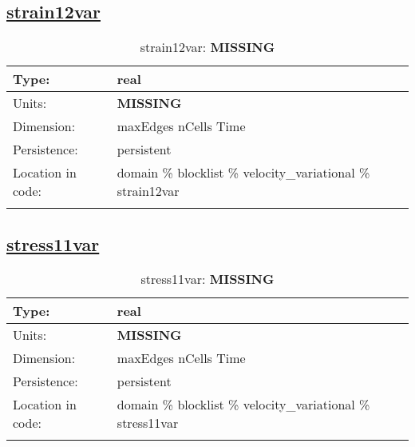 \subsection[strain12var]{\hyperref[sec:var_tab_velocity_variational]{strain12var}}
\label{subsec:var_sec_velocity_variational_strain12var}
\begin{center}
\begin{longtable}{| p{2.0in} | p{4.0in} |}
        \hline 
        Type: & real \\
        \hline 
        Units: & {\bf \color{red} MISSING} \\
        \hline 
        Dimension: & maxEdges nCells Time \\
        \hline 
        Persistence: & persistent \\
        \hline 
         Location in code: & domain \% blocklist \% velocity\_variational \% strain12var \\
         \hline 
    \caption{strain12var: {\bf \color{red} MISSING}}
\end{longtable}
\end{center}
\subsection[stress11var]{\hyperref[sec:var_tab_velocity_variational]{stress11var}}
\label{subsec:var_sec_velocity_variational_stress11var}
\begin{center}
\begin{longtable}{| p{2.0in} | p{4.0in} |}
        \hline 
        Type: & real \\
        \hline 
        Units: & {\bf \color{red} MISSING} \\
        \hline 
        Dimension: & maxEdges nCells Time \\
        \hline 
        Persistence: & persistent \\
        \hline 
         Location in code: & domain \% blocklist \% velocity\_variational \% stress11var \\
         \hline 
    \caption{stress11var: {\bf \color{red} MISSING}}
\end{longtable}
\end{center}
